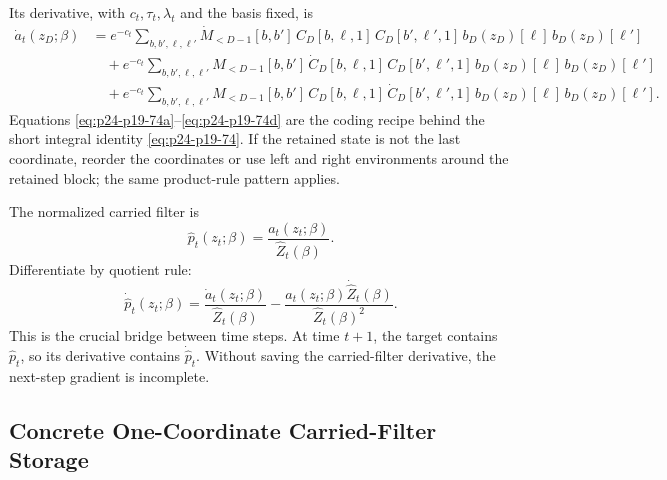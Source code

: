 \documentclass[11pt]{article}
\numberwithin{equation}{section}
\begin{document}
Its derivative, with \(c_t,\tau_t,\lambda_t\) and the basis fixed, is
\begin{equation}
\begin{aligned}
    \dot a_t(z_D;\beta)
    &=
    e^{-c_t}
    \sum_{b,b',\ell,\ell'}
    \dot M_{<D-1}[b,b']\,
    C_D[b,\ell,1]\,
    C_D[b',\ell',1]\,
    b_D(z_D)[\ell]\,
    b_D(z_D)[\ell']\\
    &\quad+
    e^{-c_t}
    \sum_{b,b',\ell,\ell'}
    M_{<D-1}[b,b']\,
    \dot C_D[b,\ell,1]\,
    C_D[b',\ell',1]\,
    b_D(z_D)[\ell]\,
    b_D(z_D)[\ell']\\
    &\quad+
    e^{-c_t}
    \sum_{b,b',\ell,\ell'}
    M_{<D-1}[b,b']\,
    C_D[b,\ell,1]\,
    \dot C_D[b',\ell',1]\,
    b_D(z_D)[\ell]\,
    b_D(z_D)[\ell'].
\end{aligned}
    \label{eq:p24-p19-74d}
\end{equation}
Equations \eqref{eq:p24-p19-74a}--\eqref{eq:p24-p19-74d} are the coding recipe behind the short integral
identity \eqref{eq:p24-p19-74}.  If the retained state is not the last coordinate, reorder the
coordinates or use left and right environments around the retained block; the
same product-rule pattern applies.

The normalized carried filter is
\begin{equation}
    \widehat p_t(z_t;\beta)
    =
    \frac{a_t(z_t;\beta)}{\widehat Z_t(\beta)}.
    \label{eq:p24-p19-75}
\end{equation}
Differentiate by quotient rule:
\begin{equation}
    \dot{\widehat p}_t(z_t;\beta)
    =
    \frac{\dot a_t(z_t;\beta)}{\widehat Z_t(\beta)}
    -
    \frac{a_t(z_t;\beta)\dot{\widehat Z}_t(\beta)}
    {\widehat Z_t(\beta)^2}.
    \label{eq:p24-p19-76}
\end{equation}
This is the crucial bridge between time steps.  At time \(t+1\), the target
contains \(\widehat p_t\), so its derivative contains
\(\dot{\widehat p}_t\).  Without saving the carried-filter derivative, the
next-step gradient is incomplete.

\subsection{Concrete One-Coordinate Carried-Filter Storage}
\end{document}
